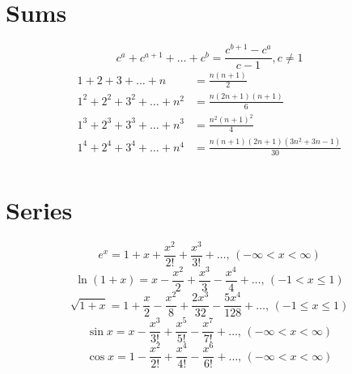 


\section{Sums}
\[ c^a + c^{a+1} + \dots + c^{b} = \frac{c^{b+1} - c^a}{c-1}, c \neq 1 \]
\begin{align*}
	1 + 2 + 3 + \dots + n &= \frac{n(n+1)}{2} \\
	1^2 + 2^2 + 3^2 + \dots + n^2 &= \frac{n(2n+1)(n+1)}{6} \\
	1^3 + 2^3 + 3^3 + \dots + n^3 &= \frac{n^2(n+1)^2}{4} \\
	1^4 + 2^4 + 3^4 + \dots + n^4 &= \frac{n(n+1)(2n+1)(3n^2 + 3n - 1)}{30} \\
\end{align*}

\section{Series}
$$e^x = 1+x+\frac{x^2}{2!}+\frac{x^3}{3!}+\dots,\,(-\infty<x<\infty)$$
$$\ln(1+x) = x-\frac{x^2}{2}+\frac{x^3}{3}-\frac{x^4}{4}+\dots,\,(-1<x\leq1)$$
$$\sqrt{1+x} = 1+\frac{x}{2}-\frac{x^2}{8}+\frac{2x^3}{32}-\frac{5x^4}{128}+\dots,\,(-1\leq x\leq1)$$
$$\sin x = x-\frac{x^3}{3!}+\frac{x^5}{5!}-\frac{x^7}{7!}+\dots,\,(-\infty<x<\infty)$$
$$\cos x = 1-\frac{x^2}{2!}+\frac{x^4}{4!}-\frac{x^6}{6!}+\dots,\,(-\infty<x<\infty)$$

